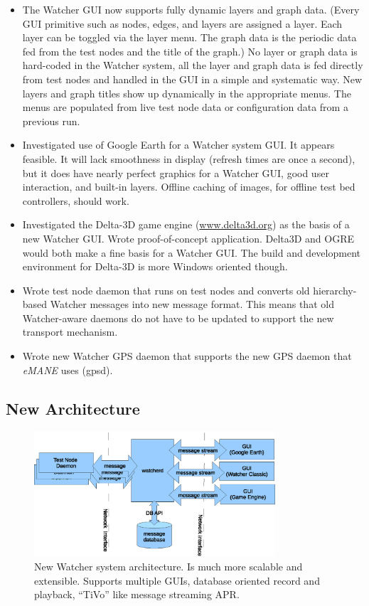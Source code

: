 \documentclass{report}
\begin{document}
\begin{itemize}
\item The Watcher GUI now supports fully dynamic layers and graph data. (Every GUI primitive such as nodes, edges, and layers are assigned a layer. Each layer can be
toggled via the layer menu. The graph data is the periodic data fed from the test nodes and the title of the graph.) No layer or graph data is hard-coded in the Watcher system, all 
the layer and graph data is fed directly from test nodes and handled in the GUI in a simple and systematic way. New layers and graph titles show up dynamically in the appropriate 
menus. The menus are populated from live test node data or configuration data from a previous run.
\item Investigated use of Google Earth for a Watcher system GUI. It appears feasible. It will lack smoothness in display (refresh times are once a second), but it 
does have nearly perfect graphics for a Watcher GUI, good user interaction, and built-in layers. Offline caching of images, for offline test bed controllers, should work. 
\item Investigated the Delta-3D game engine (\url{www.delta3d.org}) as the basis of a new Watcher GUI. Wrote proof-of-concept application. Delta3D and OGRE would both make 
a fine basis for a Watcher GUI. The build and development environment for Delta-3D is more Windows oriented though. 
\item Wrote test node daemon that runs on test nodes and converts old hierarchy-based Watcher messages into new message format. 
This means that old Watcher-aware daemons do not have to be updated to support the new transport mechanism.
\item Wrote new Watcher GPS daemon that supports the new GPS daemon that {\it eMANE} uses (gpsd). 
\end{itemize}

\subsection{New Architecture}
\label{newArch}

\begin{figure}[htb]
\centering
\includegraphics[width=0.8\textwidth]{watcherArch.eps}
\caption{New Watcher system architecture. Is much more scalable and extensible. Supports multiple GUIs, database oriented record and playback, ``TiVo'' like message streaming APR.} 
\label{fig:watcherArch}
\end{figure}
\end{document}

